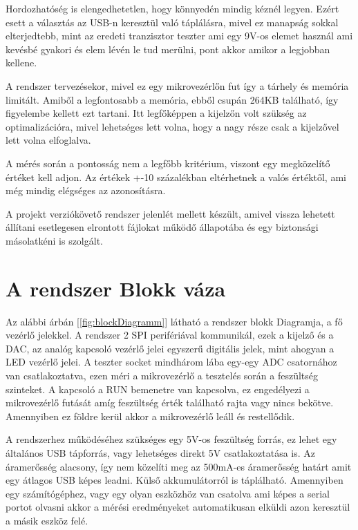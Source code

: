 Hordozhatóség is elengedhetetlen, hogy könnyedén mindig kéznél legyen.
Ezért esett a választás az USB-n keresztül való táplálásra, mivel ez 
manapság sokkal elterjedtebb, mint az eredeti tranzisztor teszter ami egy
9V-os elemet használ ami kevésbé gyakori és elem lévén le tud merülni, pont 
akkor amikor a legjobban kellene.

A rendszer tervezésekor, mivel ez egy mikrovezérlőn fut így a 
tárhely és memória limitált. Amiből a legfontosabb a memória, ebből 
csupán 264KB található, így figyelembe kellett ezt tartani. Itt 
legfőképpen a kijelzőn volt szükség az optimalizációra, mivel 
lehetséges lett volna, hogy a nagy része csak a kijelzővel lett volna elfoglalva.

A mérés során a pontosság nem a legfőbb kritérium, viszont egy megközelítő
értéket kell adjon. Az értékek +-10 százalékban eltérhetnek a valós értéktől, 
ami még mindig elégséges az azonosításra. 

A projekt verziókövető rendszer jelenlét mellett készült, amivel
vissza lehetett állítani esetlegesen elrontott fájlokat működő állapotába
és egy biztonsági másolatkéni is szolgált.

\section{A rendszer Blokk váza}

Az alábbi árbán [\ref{fig:blockDiagramm}] látható a rendszer blokk Diagramja, a fő vezérlő jelekkel.
A rendszer 2 SPI perifériával kommunikál, ezek a kijelző és a DAC, az analóg kapcsoló vezérlő jelei 
egyszerű digitális jelek, mint ahogyan a LED vezérlő jelei. A teszter socket mindhárom lába egy-egy ADC
csatornához van csatlakoztatva, ezen méri a mikrovezérlő a tesztelés során a feszültség szinteket.
A kapcsoló a RUN bemenetre van kapcsolva, ez engedélyezi a mikrovezérlő futását amíg feszültség érték 
található rajta vagy nincs bekötve. Amennyiben ez földre kerül akkor a mikrovezérlő leáll és restellődik.

A rendszerhez működéséhez szükséges egy 5V-os feszültség forrás, ez lehet egy általános USB
tápforrás, vagy lehetséges direkt 5V csatlakoztatása is. Az áramerősség alacsony, így nem közelíti
meg az 500mA-es áramerősség határt amit egy átlagos USB képes leadni. Külső akkumulátorról
is táplálható. Amennyiben egy számítógéphez, vagy egy olyan eszközhöz van csatolva ami képes 
a serial portot olvasni akkor a mérési eredményeket automatikusan elküldi azon keresztül a 
másik eszköz felé. 


